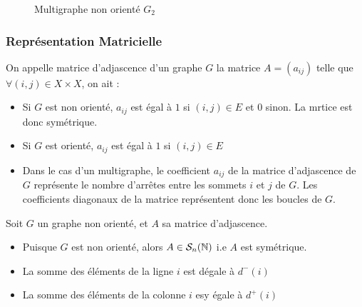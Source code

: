 \begin{example}
\begin{figure}[h]
\begin{minipage} {0.45\textwidth}
            \caption{Multigraphe non orienté $G_2$}
            \label{fig:K5-entiers}
        \end{minipage}
      \end{figure}
\end{example}

\subsubsection{Représentation Matricielle}

\begin{definition}
    On appelle matrice d'adjascence d'un graphe $G$ la matrice $A = (a_{ij})$ telle que 
    $\forall (i,j) \in X \times X$, on ait :
    \begin{itemize}
        \item Si $G$ est non orienté, $a_{ij}$ est égal à $1$ si $(i,j) \in E$ et $0$ sinon. La mrtice est donc symétrique.
        \item Si $G$ est orienté, $a_{ij}$ est égal à $1$ si $(i,j) \in E$
        \item Dans le cas d'un multigraphe, le coefficient $a_{ij}$ de la matrice d'adjascence de $G$ représente le nombre d'arrêtes entre les sommets $i$ et $j$ de $G$.
                Les coefficients diagonaux de la matrice représentent donc les boucles de $G$.
    \end{itemize}
\end{definition}


\begin{prop}
    Soit $G$ un graphe non orienté, et $A$ sa matrice d'adjascence.
    \begin{itemize}
        \item Puisque $G$ est non orienté, alors $A \in \mathcal{S}_n(\mathbb{N})$ i.e $A$ est symétrique.
        \item La somme des éléments de la ligne $i$ est dégale à $d^-(i)$
        \item La somme des éléments de la colonne $i$ esy égale à $d^+(i)$
    \end{itemize}
\end{prop}

